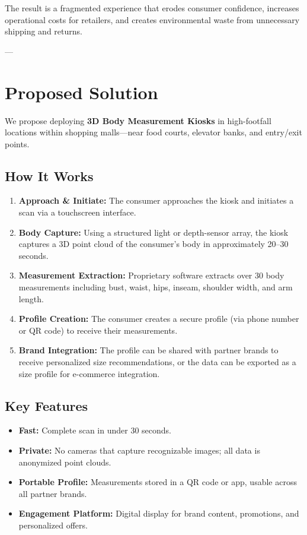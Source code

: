 \documentclass[12pt,a4paper]{article}
\begin{document}
The result is a fragmented experience that erodes consumer confidence, increases operational costs for retailers, and creates environmental waste from unnecessary shipping and returns.

---

\section{Proposed Solution}

We propose deploying \textbf{3D Body Measurement Kiosks} in high-footfall locations within shopping malls---near food courts, elevator banks, and entry/exit points.

\subsection{How It Works}

\begin{enumerate}
    \item \textbf{Approach \& Initiate:} The consumer approaches the kiosk and initiates a scan via a touchscreen interface.
    \item \textbf{Body Capture:} Using a structured light or depth-sensor array, the kiosk captures a 3D point cloud of the consumer's body in approximately 20--30 seconds.
    \item \textbf{Measurement Extraction:} Proprietary software extracts over 30 body measurements including bust, waist, hips, inseam, shoulder width, and arm length.
    \item \textbf{Profile Creation:} The consumer creates a secure profile (via phone number or QR code) to receive their measurements.
    \item \textbf{Brand Integration:} The profile can be shared with partner brands to receive personalized size recommendations, or the data can be exported as a size profile for e-commerce integration.
\end{enumerate}

\subsection{Key Features}

\begin{itemize}
    \item \textbf{Fast:} Complete scan in under 30 seconds.
    \item \textbf{Private:} No cameras that capture recognizable images; all data is anonymized point clouds.
    \item \textbf{Portable Profile:} Measurements stored in a QR code or app, usable across all partner brands.
    \item \textbf{Engagement Platform:} Digital display for brand content, promotions, and personalized offers.
\end{itemize}
\end{document}
